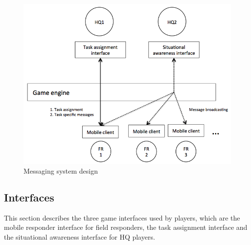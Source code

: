 \begin{figure}[h]
  \centering
  \includegraphics[width=1\textwidth]{img/study3/system/Interfaces}
  \caption{Messaging system design}
  \label{fig:study3messaging}
\end{figure}



\subsection{Interfaces}
This section describes the three game interfaces used by players, which are the mobile responder interface for field responders, the task assignment interface and the situational awareness interface for HQ players.\\


